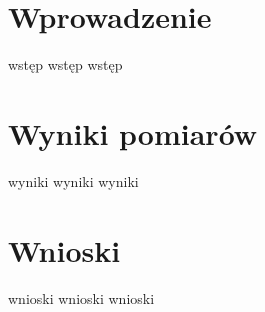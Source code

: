 \documentclass[12pt,a4paper]{article}
\begin{document}
\maketitle
\tableofcontents
\newpage


\section{Wprowadzenie}
wstęp wstęp wstęp

\section{Wyniki pomiarów}
wyniki wyniki wyniki


\section{Wnioski}
wnioski wnioski wnioski




\clearpage
\end{document}
